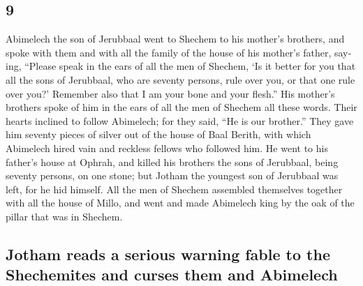 \begin{paracol}{2}
\begin{otherlanguage}{english}
\hypertarget{section-17}{%
\section{9}\label{section-17}}

 Abimelech the son of Jerubbaal went to Shechem to his
mother's brothers, and spoke with them and with all the family of the
house of his mother's father, saying,  ``Please speak in
the ears of all the men of Shechem, `Is it better for you that all the
sons of Jerubbaal, who are seventy persons, rule over you, or that one
rule over you?' Remember also that I am your bone and your flesh.''
 His mother's brothers spoke of him in the ears of all the
men of Shechem all these words. Their hearts inclined to follow
Abimelech; for they said, ``He is our brother.''  They
gave him seventy pieces of silver out of the house of Baal Berith, with
which Abimelech hired vain and reckless fellows who followed him.
 He went to his father's house at Ophrah, and killed his
brothers the sons of Jerubbaal, being seventy persons, on one stone; but
Jotham the youngest son of Jerubbaal was left, for he hid himself.
 All the men of Shechem assembled themselves together with
all the house of Millo, and went and made Abimelech king by the oak of
the pillar that was in Shechem.

\hypertarget{jotham-reads-a-serious-warning-fable-to-the-shechemites-and-curses-them-and-abimelech}{%
\subsection{Jotham reads a serious warning fable to the Shechemites and
curses them and
Abimelech}\label{jotham-reads-a-serious-warning-fable-to-the-shechemites-and-curses-them-and-abimelech}}


\end{otherlanguage}
\end{paracol}
